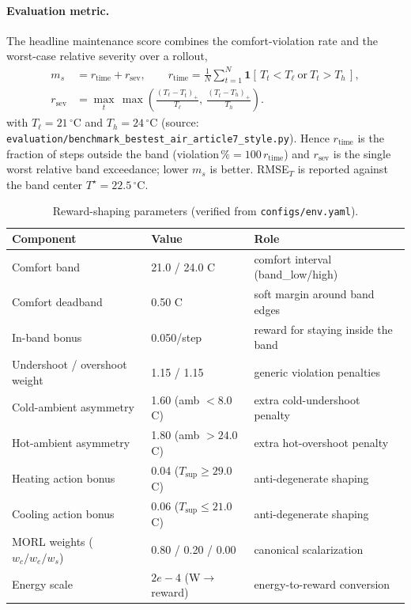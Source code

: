 \documentclass[11pt,a4paper]{article}
\begin{document}
\paragraph{Evaluation metric.} The headline maintenance score combines the comfort-violation rate and the worst-case relative severity over a rollout,
\begin{equation}
\begin{aligned}
  m_s &= r_{\mathrm{time}} + r_{\mathrm{sev}},
  \qquad
  r_{\mathrm{time}} = \frac{1}{N}\sum_{t=1}^{N} \mathbf{1}\!\left[\,T_t < T_{\ell}\ \text{or}\ T_t > T_{h}\,\right], \\[3pt]
  r_{\mathrm{sev}} &= \max_{t}\, \max\!\left(\frac{(T_{\ell}-T_t)_+}{T_{\ell}},\ \frac{(T_t-T_{h})_+}{T_{h}}\right).
\end{aligned}
\label{eq:ms}
\end{equation}
with $T_{\ell}=21\,^\circ$C and $T_{h}=24\,^\circ$C (source: \texttt{evaluation/benchmark\_bestest\_air\_article7\_style.py}). Hence $r_{\mathrm{time}}$ is the fraction of steps outside the band (violation\,$\%=100\,r_{\mathrm{time}}$) and $r_{\mathrm{sev}}$ is the single worst relative band exceedance; lower $m_s$ is better. RMSE$_T$ is reported against the band center $T^{\star}=22.5\,^\circ$C.

\begin{table}[H]
\centering
\caption{Reward-shaping parameters (verified from \texttt{configs/env.yaml}).}
\label{tab:reward}
\small
\begin{tabularx}{\linewidth}{llX}
\toprule
Component & Value & Role \\
\midrule
Comfort band & 21.0 / 24.0 C & comfort interval (band\_low/high) \\
Comfort deadband & 0.50 C & soft margin around band edges \\
In-band bonus & 0.050/step & reward for staying inside the band \\
Undershoot / overshoot weight & 1.15 / 1.15 & generic violation penalties \\
Cold-ambient asymmetry & 1.60 (amb $<8.0$ C) & extra cold-undershoot penalty \\
Hot-ambient asymmetry & 1.80 (amb $>24.0$ C) & extra hot-overshoot penalty \\
Heating action bonus & 0.04 ($T_{\mathrm{sup}}\ge 29.0$ C) & anti-degenerate shaping \\
Cooling action bonus & 0.06 ($T_{\mathrm{sup}}\le 21.0$ C) & anti-degenerate shaping \\
MORL weights ($w_c/w_e/w_s$) & 0.80 / 0.20 / 0.00 & canonical scalarization \\
Energy scale & $2e-4$ (W$\to$reward) & energy-to-reward conversion \\
\bottomrule
\end{tabularx}
\end{table}
\end{document}
